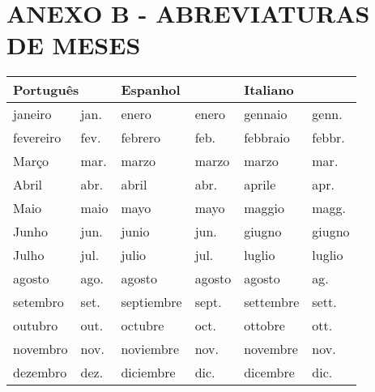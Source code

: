 \section*{\centering ANEXO B - ABREVIATURAS DE MESES}

\vspace{1 cm}

\normalsize

\centering

\begin{tabular}{|ll|ll|ll|}
\hline
\multicolumn{2}{|l|}{\textbf{\large{Português}}} & \multicolumn{2}{l|}{\textbf{\large{Espanhol}}}   & \multicolumn{2}{l|}{\textbf{\large{Italiano}}}  \\ \hline
\multicolumn{1}{|l|}{janeiro}    & jan.  & \multicolumn{1}{l|}{enero}      & enero  & \multicolumn{1}{l|}{gennaio}   & genn.  \\ \hline
\multicolumn{1}{|l|}{fevereiro}  & fev.  & \multicolumn{1}{l|}{febrero}    & feb.   & \multicolumn{1}{l|}{febbraio}  & febbr. \\ \hline
\multicolumn{1}{|l|}{Março}      & mar.  & \multicolumn{1}{l|}{marzo}      & marzo  & \multicolumn{1}{l|}{marzo}     & mar.   \\ \hline
\multicolumn{1}{|l|}{Abril}      & abr.  & \multicolumn{1}{l|}{abril}      & abr.   & \multicolumn{1}{l|}{aprile}    & apr.   \\ \hline
\multicolumn{1}{|l|}{Maio}       & maio  & \multicolumn{1}{l|}{mayo}       & mayo   & \multicolumn{1}{l|}{maggio}    & magg.  \\ \hline
\multicolumn{1}{|l|}{Junho}      & jun.  & \multicolumn{1}{l|}{junio}      & jun.   & \multicolumn{1}{l|}{giugno}    & giugno \\ \hline
\multicolumn{1}{|l|}{Julho}      & jul.  & \multicolumn{1}{l|}{julio}      & jul.   & \multicolumn{1}{l|}{luglio}    & luglio \\ \hline
\multicolumn{1}{|l|}{agosto}     & ago.  & \multicolumn{1}{l|}{agosto}     & agosto & \multicolumn{1}{l|}{agosto}    & ag.    \\ \hline
\multicolumn{1}{|l|}{setembro}   & set.  & \multicolumn{1}{l|}{septiembre} & sept.  & \multicolumn{1}{l|}{settembre} & sett.  \\ \hline
\multicolumn{1}{|l|}{outubro}    & out.  & \multicolumn{1}{l|}{octubre}    & oct.   & \multicolumn{1}{l|}{ottobre}   & ott.   \\ \hline
\multicolumn{1}{|l|}{novembro}   & nov.  & \multicolumn{1}{l|}{noviembre}  & nov.   & \multicolumn{1}{l|}{novembre}  & nov.   \\ \hline
\multicolumn{1}{|l|}{dezembro}   & dez.  & \multicolumn{1}{l|}{diciembre}  & dic.   & \multicolumn{1}{l|}{dicembre}  & dic.   \\ \hline
\end{tabular}